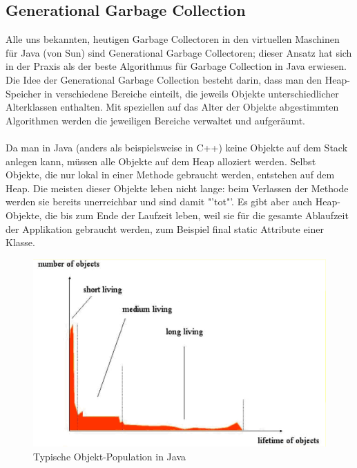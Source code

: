 \documentclass[a4paper,14pt]{scrreprt}
\begin{document}
\subsection{Generational Garbage Collection}
Alle uns bekannten, heutigen Garbage Collectoren in den virtuellen Maschinen für Java (von Sun) sind Generational Garbage Collectoren; dieser Ansatz hat sich in der Praxis als der beste Algorithmus für Garbage Collection in Java erwiesen. Die Idee der Generational Garbage Collection besteht darin, dass man den Heap-Speicher in verschiedene Bereiche einteilt, die jeweils Objekte unterschiedlicher Alterklassen enthalten.  Mit speziellen auf das Alter der Objekte abgestimmten Algorithmen werden die jeweiligen Bereiche verwaltet und aufgeräumt.\\\\Da man in Java (anders als beispielsweise in C++) keine Objekte auf dem Stack anlegen kann, müssen alle Objekte auf dem Heap alloziert werden. Selbst Objekte, die nur lokal in einer Methode gebraucht werden, entstehen auf dem Heap.  Die meisten dieser Objekte leben nicht lange: beim Verlassen der Methode werden sie bereits unerreichbar und sind damit "'tot"'.  Es gibt aber auch Heap-Objekte, die bis zum Ende der Laufzeit leben, weil sie für die gesamte Ablaufzeit der Applikation gebraucht werden, zum Beispiel final static Attribute einer Klasse.
\begin{figure}[h!]
\centering
\includegraphics[width=0.8\linewidth]{./imageG8T}
\caption[Typische Objekt-Population in Java]{Typische Objekt-Population in Java}
\label{fig:imageG8T}
\end{figure}
\end{document}
